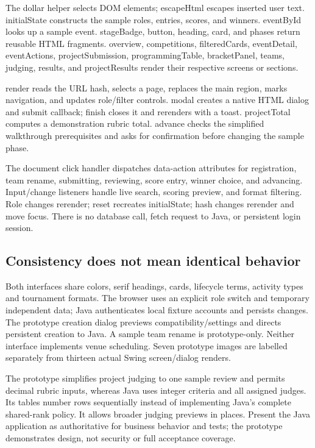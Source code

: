 \documentclass[12pt]{article}
\begin{document}
The dollar helper selects DOM elements; escapeHtml escapes inserted user text. initialState constructs the sample roles, entries, scores, and winners. eventById looks up a sample event. stageBadge, button, heading, card, and phases return reusable HTML fragments. overview, competitions, filteredCards, eventDetail, eventActions, projectSubmission, programmingTable, bracketPanel, teams, judging, results, and projectResults render their respective screens or sections.

render reads the URL hash, selects a page, replaces the main region, marks navigation, and updates role/filter controls. modal creates a native HTML dialog and submit callback; finish closes it and rerenders with a toast. projectTotal computes a demonstration rubric total. advance checks the simplified walkthrough prerequisites and asks for confirmation before changing the sample phase.

The document click handler dispatches data-action attributes for registration, team rename, submitting, reviewing, score entry, winner choice, and advancing. Input/change listeners handle live search, scoring preview, and format filtering. Role changes rerender; reset recreates initialState; hash changes rerender and move focus. There is no database call, fetch request to Java, or persistent login session.

\subsection{Consistency does not mean identical behavior}
Both interfaces share colors, serif headings, cards, lifecycle terms, activity types and tournament formats. The browser uses an explicit role switch and temporary independent data; Java authenticates local fixture accounts and persists changes. The prototype creation dialog previews compatibility/settings and directs persistent creation to Java. A sample team rename is prototype-only. Neither interface implements venue scheduling. Seven prototype images are labelled separately from thirteen actual Swing screen/dialog renders.

The prototype simplifies project judging to one sample review and permits decimal rubric inputs, whereas Java uses integer criteria and all assigned judges. Its tables number rows sequentially instead of implementing Java's complete shared-rank policy. It allows broader judging previews in places. Present the Java application as authoritative for business behavior and tests; the prototype demonstrates design, not security or full acceptance coverage.
\end{document}
